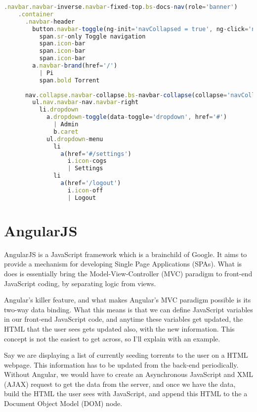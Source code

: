 \vspace{20px}
\begin{lstlisting}[caption=AngularJS binding data with \$scope keyword, language=JavaScript]
  .navbar.navbar-inverse.navbar-fixed-top.bs-docs-nav(role='banner')
    .container
      .navbar-header
        button.navbar-toggle(ng-init='navCollapsed = true', ng-click='navCollapsed = !navCollapsed')
          span.sr-only Toggle navigation
          span.icon-bar
          span.icon-bar
          span.icon-bar
        a.navbar-brand(href='/')
          | Pi
          span.bold Torrent
  
      nav.collapse.navbar-collapse.bs-navbar-collapse(collapse='navCollapsed')
        ul.nav.navbar-nav.navbar-right
          li.dropdown
            a.dropdown-toggle(data-toggle='dropdown', href='#')
              | Admin
              b.caret
            ul.dropdown-menu
              li
                a(href='#/settings')
                  i.icon-cogs
                  | Settings
              li
                a(href='/logout')
                  i.icon-off
                  | Logout
\end{lstlisting}


\section{AngularJS}
AngularJS\cite{AngularJS} is a JavaScript framework which is a brainchild of Google. It aims to provide a mechanism for developing Single Page Applications (SPAs). What is does is essentially bring the Model-View-Controller (MVC) paradigm to front-end JavaScript coding, by separating logic from views.

Angular's killer feature, and what makes Angular's MVC paradigm possible is its two-way data binding. What this means is that we can define JavaScript variables in our front-end JavaScript code, and anytime these variables get updated, the HTML that the user sees gets updated also, with the new information. This concept is not the easiest to get across, so I'll explain with an example.

Say we are displaying a list of currently seeding torrents to the user on a HTML webpage. This information has to be updated from the back-end periodically. Without Angular, we would have to create an Asynchronous JavaScript and XML (AJAX) request to get the data from the server, and once we have the data, build the HTML the user sees with JavaScript, and append this HTML to the a Document Object Model (DOM) node.

